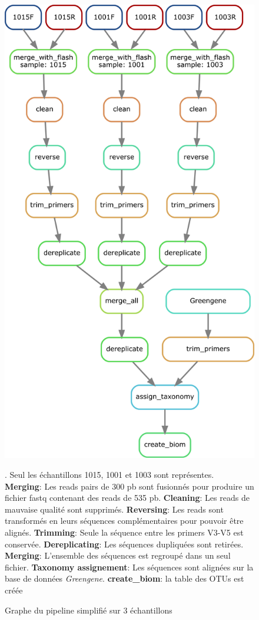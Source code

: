 \documentclass[12pt,a4paper]{article}
\begin{document}
\begin{figure}[!ht]
\begin{center}
\includegraphics[scale=0.5]{img/pipeline_trio.png}\hfill
\end{center}
\caption{Graphe du pipeline simplifié sur 3 échantillons}.
Seul les échantillons 1015, 1001 et 1003 sont représentes.\\ \textbf{Merging}: Les reads pairs de 300 pb sont fusionnés  pour produire un fichier fastq contenant des reads de 535 pb. \textbf{Cleaning}: Les reads de mauvaise qualité sont supprimés. \textbf{Reversing}: Les reads sont transformés en leurs séquences complémentaires pour pouvoir être alignés. \textbf{Trimming}: Seule la séquence entre les primers V3-V5 est conservée. \textbf{Dereplicating}: Les séquences dupliquées sont retirées. \textbf{Merging}: L'ensemble des séquences est regroupé dans un seul fichier. \textbf{Taxonomy assignement}: Les séquences sont alignées sur la base de données \textit{Greengene}. \textbf{create\_biom}: la table des OTUs est créée 
\label{pipeline_trio}
\end{figure}
\end{document}
